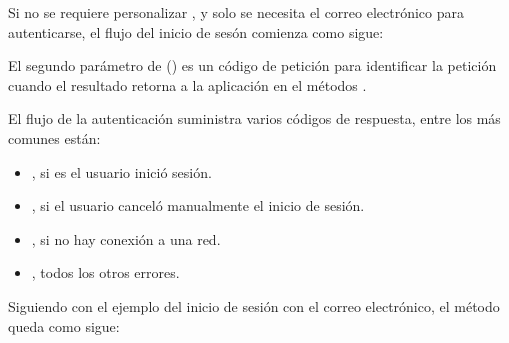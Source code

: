Si no se requiere personalizar , y solo se necesita el correo electrónico para
autenticarse, el flujo del inicio de sesón comienza como sigue:

%
\begin{sphinxVerbatim}[commandchars=\\\{\}]
      


\end{sphinxVerbatim}

El segundo parámetro de  ()  es un
código de petición para identificar la petición cuando el resultado retorna
a la aplicación en el métodos .

El flujo de la autenticación suministra varios códigos de respuesta, entre
los más comunes están:
\begin{itemize}
\item {} 
, si es el usuario inició sesión.

\item {} 
, si el usuario canceló manualmente el inicio de sesión.

\item {} 
, si no hay conexión a una red.

\item {} 
,  todos los otros errores.

\end{itemize}

Siguiendo con el ejemplo del inicio de sesión con el correo electrónico,
el método  queda como sigue:

